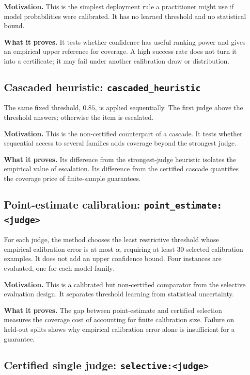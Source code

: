 \documentclass[10pt]{article}
\DeclareRobustCommand{\method}[1]{\nolinkurl{#1}}
\begin{document}
\textbf{Motivation.} This is the simplest deployment rule a practitioner might use if
model probabilities were calibrated. It has no learned threshold and no statistical
bound.

\textbf{What it proves.} It tests whether confidence has useful ranking power and gives
an empirical upper reference for coverage. A high success rate does not turn it into a
certificate; it may fail under another calibration draw or distribution.

\subsection[Cascaded heuristic]{Cascaded heuristic: \method{cascaded_heuristic}}

The same fixed threshold, $0.85$, is applied sequentially. The first judge above the
threshold answers; otherwise the item is escalated.

\textbf{Motivation.} This is the non-certified counterpart of a cascade. It tests whether
sequential access to several families adds coverage beyond the strongest judge.

\textbf{What it proves.} Its difference from the strongest-judge heuristic isolates the
empirical value of escalation. Its difference from the certified cascade quantifies the
coverage price of finite-sample guarantees.

\subsection[Point-estimate calibration]{Point-estimate calibration: \method{point_estimate:<judge>}}

For each judge, the method chooses the least restrictive threshold whose empirical
calibration error is at most $\alpha$, requiring at least 30 selected calibration
examples. It does not add an upper confidence bound. Four instances are evaluated, one
for each model family.

\textbf{Motivation.} This is a calibrated but non-certified comparator from the selective
evaluation design. It separates threshold learning from statistical uncertainty.

\textbf{What it proves.} The gap between point-estimate and certified selection measures
the coverage cost of accounting for finite calibration size. Failure on held-out splits
shows why empirical calibration error alone is insufficient for a guarantee.

\subsection[Certified single judge]{Certified single judge: \method{selective:<judge>}}
\end{document}
